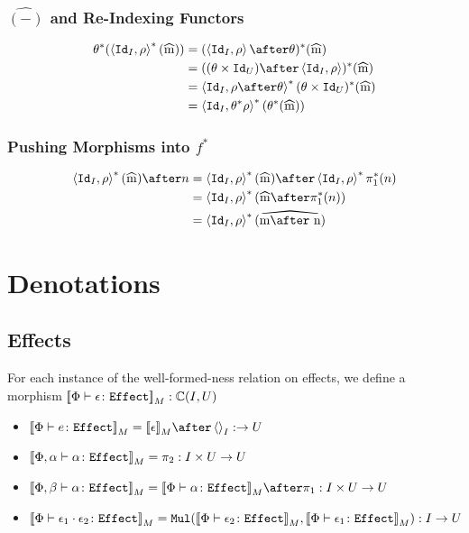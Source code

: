 \documentclass{report}
\newcommand\effect[0]{\texttt{Effect}}
\newcommand\ciu[0]{\C(I, U)}
\newcommand\Mul[0]{\texttt{Mul}}
\renewcommand\star[0]{^*}
\renewcommand\widehat[1]{%
\savestack{\tmpbox}{\stretchto{%
  \scaleto{%
    \scalerel*[\widthof{\ensuremath{#1}}]{\kern.1pt\mathchar"0362\kern.1pt}%
    {\rule{0ex}{\textheight}}%
  }{\textheight}%
}{2.4ex}}%
\stackon[-6.9pt]{#1}{\tmpbox}%
}
\newcommand\pstar[0]{\p\star}
\begin{document}
\subsection{$\hat{(-)}$ and Re-Indexing Functors}
\begin{align}
    \theta\star(\pr{\Id{I}}{\rho}\star(\widehat{m})) &= (\pr{\Id{I}}{\rho}\after\theta)\star(\widehat{m})\\
    & = ((\theta\times\Id{U})\after\pr{\Id{I}}{\rho})\star(\widehat{m})\\
    & = \pr{\Id{I}}{\rho\after\theta}\star(\theta\times\Id{U})\star(\widehat{m}) \\
    & = \pr{\Id{I}}{\theta\star\rho}\star(\theta\star(\widehat{m}))
\end{align}

\subsection{Pushing Morphisms into $f\star$}

\begin{align}
    \pr{\Id{I}}{\rho}\star(\widehat{m})\after n &= \pr{\Id{I}}{\rho}\star(\widehat{m})\after\pr{\Id{I}}{\rho}\star\p\star(n)\\
    & = \pr{\Id{I}}{\rho}\star(\widehat{m}\after\pstar(n))\\
    &= \pr{\Id{I}}{\rho}\star(\widehat{m\after n})
\end{align}

\chapter{Denotations}
\section{Effects}
For each instance of the well-formed-ness relation on effects, we define a morphism $\deno{\typerelation{\P}{\e}{\effect}}: \ciu$

\begin{itemize}
    \item $\deno{\typerelation{\P}{e}{\effect}} = \deno{\e} \after \term{I}: \rightarrow U$
    \item $\deno{\typerelation{\P,\a}{\a}{\effect}} = \pp: I\times U \rightarrow U$
    
    \item $\deno{\typerelation{\P, \b}{\a}{\effect}} = \deno{\typerelation{\P}{\a}{\effect}}\after\p: I\times U\rightarrow U$
    
    \item $\deno{\typerelation{\P}{\e_1\dot \e_2}{\effect}} = \Mul(\deno{\typerelation{\P}{\e_2}{\effect}},\deno{\typerelation{\P}{\e_1}{\effect}}): I \rightarrow U$
\end{itemize}
\end{document}
